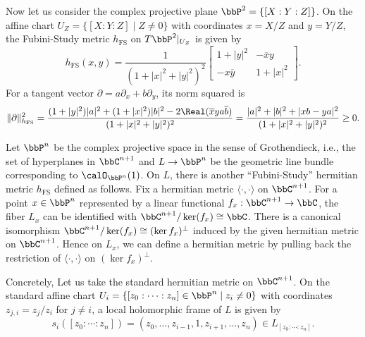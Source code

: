     \begin{example}\label{eg:Fubini-Study_metric_on_P^2}
        Now let us consider the complex projective plane \(\bbP^2 = \{[X:Y:Z]\}\).
        On the affine chart \(U_Z = \{[X:Y:Z] \mid Z \neq 0\}\) with coordinates \(x = X/Z\) and \(y = Y/Z\), 
        the Fubini-Study metric \(h_{\text{FS}}\) on \(T \bbP^2|_{U_Z}\) is given by
        \[ h_{\text{FS}}(x,y) = \frac{1}{(1 + |x|^2 + |y|^2)^2}\begin{bmatrix}
            1 + |y|^2 & -\overline{x} y \\
            -x \overline{y} & 1 + |x|^2
        \end{bmatrix}. \]
        For a tangent vector \(\partial = a \partial_x + b \partial_y\), its norm squared is
        \[ \|\partial\|_{h_{\text{FS}}}^2 = \frac{(1 + |y|^2)|a|^2 + (1 + |x|^2)|b|^2 - 2 \Real(\overline{x} y a \overline{b})}{(1 + |x|^2 + |y|^2)^2} = \frac{|a|^2 + |b|^2 + |x b - y a|^2}{(1 + |x|^2 + |y|^2)^2} \geq 0. \]
    \end{example}

    \begin{example}\label{eg:Fubini-Study_metric_on_O_1}
        Let \(\bbP^n\) be the complex projective space in the sense of Grothendieck, i.e., the set of hyperplanes in \(\bbC^{n+1}\) and \(L \to \bbP^n\) be the geometric line bundle corresponding to \(\calO_{\bbP^n}(1)\).
        On \(L\), there is another ``Fubini-Study'' hermitian metric \(h_{\text{FS}}\) defined as follows.
        Fix a hermitian metric \(\langle \cdot, \cdot \rangle\) on \(\bbC^{n+1}\).
        For a point \(x \in \bbP^n\) represented by a linear functional \(f_x: \bbC^{n+1} \to \bbC\), the fiber \(L_x\) can be identified with \(\bbC^{n+1}/\ker(f_x) \cong \bbC\).
        There is a canonical isomorphism \(\bbC^{n+1}/\ker(f_x) \cong (\ker f_x)^\perp\) induced by the given hermitian metric on \(\bbC^{n+1}\).
        Hence on \(L_x\), we can define a hermitian metric by pulling back the restriction of \(\langle \cdot, \cdot \rangle\) on \((\ker f_x)^\perp\).
        
        Concretely, Let us take the standard hermitian metric on \(\bbC^{n+1}\).
        On the standard affine chart \(U_i = \{[z_0: \cdots : z_n] \in \bbP^n \mid z_i \neq 0\}\) with coordinates \(z_{j,i} = z_j/z_i\) for \(j \neq i\),
        a local holomorphic frame of \(L\) is given by
        \[s_i([z_0: \cdots : z_n]) = (z_0, \ldots, z_{i-1}, 1, z_{i+1}, \ldots, z_n) \in L_{[z_0: \cdots : z_n]}.\]
    \end{example}

